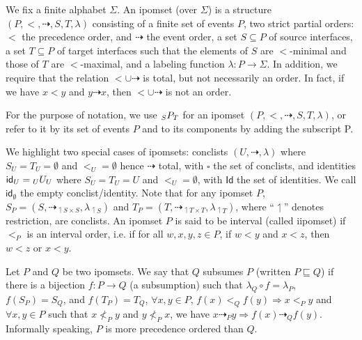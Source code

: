 \documentclass[10pt,a4paper]{article}
\begin{document}
 
We fix a finite alphabet $\Sigma$. An ipomset (over $\Sigma$) is a structure $(P,{<},{\dashrightarrow},S,T,\lambda)$ consisting of a finite set of events $P$, two strict partial orders: $<$ the precedence order, and $\dashrightarrow$ the event order, a set $S\subseteq P$ of source interfaces, a set $T\subseteq P$ of target interfaces such that the elements of $S$ are $<$-minimal and those of $T$ are $<$-maximal, and a labeling function $\lambda:P\to\Sigma$. In addition, we require that the relation ${<}\cup{\dashrightarrow}$ is total, but not necessarily an order. In fact, if we have $x<y$ and $y\dashrightarrow x$, then ${<}\cup{\dashrightarrow}$ is not an order.\par
 
 
 
For the purpose of notation, we use ${\vphantom{P}}_{S}P_{T}$ for an ipomset $(P,<,\dashrightarrow,S,T,\lambda)$, or refer to it by its set of events $P$ and to its components by adding the subscript P.\par
 
 
 
We highlight two special cases of ipomsets: conclists $(U,\dashrightarrow,\lambda)$ where $S_{U}=T_{U}=\emptyset$ and $<_{U}=\emptyset$ hence $\dashrightarrow$ total, with $\square$ the set of conclists, and identities $\mathsf{id}_{U}={\vphantom{U}}_{U}U_{U}$ where $S_{U}=T_{U}=U$ and $<_{U}=\emptyset$, with $\mathsf{Id}$ the set of identities. We call $\mathsf{id}_{\emptyset}$ the empty conclist/identity. Note that for any ipomset $P$, $S_{P}=(S,{\dashrightarrow_{\upharpoonleft S\times S}},\lambda_{\upharpoonleft S})$ and $T_{P}=(T,{\dashrightarrow_{\upharpoonleft T\times T}},\lambda_{\upharpoonleft T})$, where “\ensuremath{\upharpoonleft}” denotes restriction, are conclists. An ipomset $P$ is said to be interval (called iipomset) if $<_{P}$ is an interval order, i.e. if for all $w,x,y,z\in P$, if $w<y$ and $x<z$, then $w<z$ or $x<y$.\par
 
 
 
Let $P$ and $Q$ be two ipomsets. We say that $Q$ subsumes $P$ (written $P\sqsubseteq Q$) if there is a bijection $f:P\to Q$ (a subsumption) such that $\lambda_{Q}\circ f=\lambda_{P}$, $f(S_{P})=S_{Q}$, and $f(T_{P})=T_{Q}$, $\forall x,y\in P,\,f(x)<_{Q}f(y)\Rightarrow x<_{P}y$ and $\forall x,y\in P$ such that $x\nless_{P}y$ and $y\nless_{P}x$, we have $x\dashrightarrow_{P}y\Rightarrow f(x)\dashrightarrow_{Q}f(y)$. Informally speaking, $P$ is more precedence ordered than $Q$.\par
 
\end{document}

